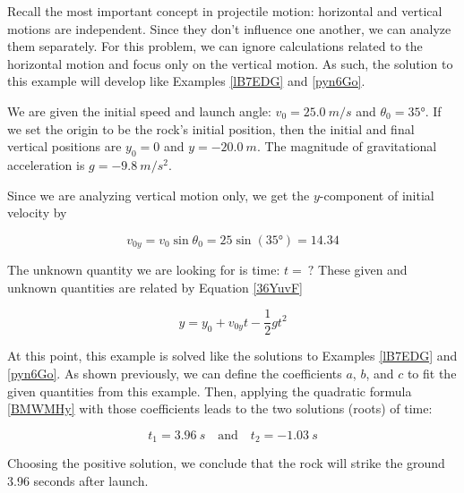 \documentclass{article}
\begin{document}
\Solution Recall the most important concept in projectile motion: horizontal and vertical motions are independent. Since they don't influence one another, we can analyze them separately. For this problem, we can ignore calculations related to the horizontal motion and focus only on the vertical motion. As such, the solution to this example will develop like Examples \ref{lB7EDG} and \ref{pyn6Go}. 

\vspace{1em}

We are given the initial speed and launch angle: $v_0 = \SI{25.0}{m/s}$ and $\theta_0 = \ang{35}$. If we set the origin to be the rock's initial position, then the initial and final vertical positions are $y_0 = 0$ and $y = \SI{-20.0}{m}$. The magnitude of gravitational acceleration is $g = \SI{-9.8}{m/s^2}$.

\vspace{1em}

Since we are analyzing vertical motion only, we get the $y$-component of initial velocity by

\begin{equation*}
    v_{0y} = v_0 \sin{\theta_0} = 25 \sin{(\ang{35})} = 14.34
\end{equation*}

 The unknown quantity we are looking for is time: $t =\ ?$ These given and unknown quantities are related by Equation \eqref{36YuvF}

\begin{equation*}
    y = y_0 + v_{0y}t - \frac{1}{2} g t^2
\end{equation*}

At this point, this example is solved like the solutions to Examples \ref{lB7EDG} and \ref{pyn6Go}. As shown previously, we can define the coefficients $a$, $b$, and $c$ to fit the given quantities from this example. Then, applying the quadratic formula \eqref{BMWMHy} with those coefficients leads to the two solutions (roots) of time:

\begin{equation*}
    t_1 = \SI{3.96}{s} \quad \text{and} \quad t_2 = \SI{-1.03}{s}
\end{equation*}

Choosing the positive solution, we conclude that the rock will strike the ground 3.96 seconds after launch.
\end{document}
